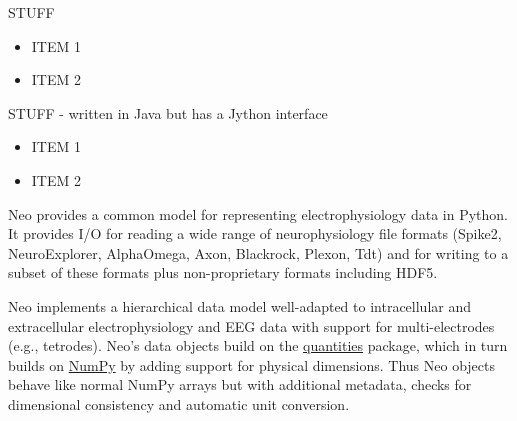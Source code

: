 \begin{multicols}{3}
%


STUFF

\begin{itemize}[nolistsep,topsep=0em,leftmargin=1pc]
\item ITEM 1
\item ITEM 2
\end{itemize}


STUFF - written in Java but has a Jython interface

\begin{itemize}[nolistsep,topsep=0em,leftmargin=1pc]
\item ITEM 1
\item ITEM 2
\end{itemize}


%


Neo provides a common model for representing
electrophysiology data in Python. It provides I/O for reading a wide
range of neurophysiology file formats (Spike2,
NeuroExplorer, AlphaOmega, Axon, Blackrock, Plexon, Tdt) and for
writing to a subset of these formats plus non-proprietary formats
including HDF5.


Neo implements a hierarchical data model well-adapted to intracellular
and extracellular electrophysiology and EEG data with support for
multi-electrodes (e.g., tetrodes).  Neo's data objects build on
the \href{http://pypi.python.org/pypi/quantities}{quantities} package,
which in turn builds on \href{http://www.numpy.org}{NumPy} by adding
support for physical dimensions. Thus Neo objects behave like
normal NumPy arrays but with additional metadata, checks for
dimensional consistency and automatic unit conversion.


\end{multicols}
